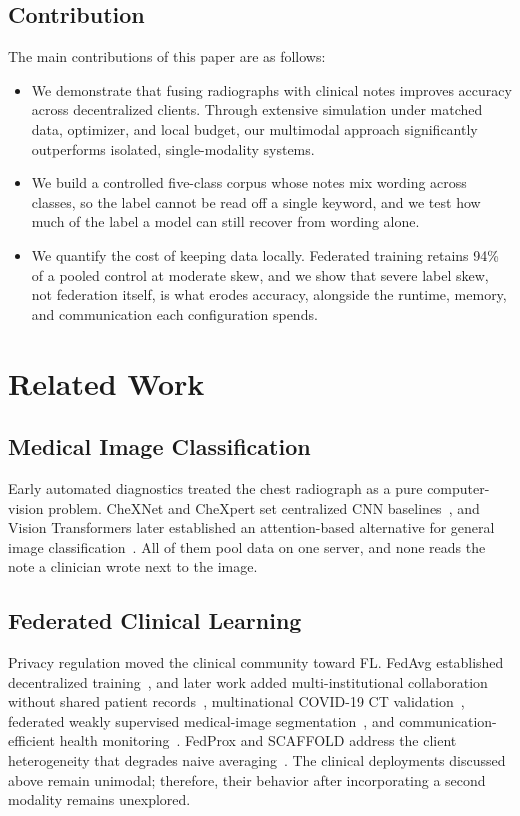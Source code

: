 \documentclass[letterpaper, conference]{IEEEtran}
\begin{document}
\subsection{Contribution}
The main contributions of this paper are as follows:
\begin{itemize}
\item We demonstrate that fusing radiographs with clinical notes improves accuracy across decentralized clients. Through extensive simulation under matched data, optimizer, and local budget, our multimodal approach significantly
outperforms isolated, single-modality systems.
\item We build a controlled five-class corpus whose notes mix wording across classes, so the label cannot be read off a single keyword, and we test how much of the label a model can still recover from wording alone.
\item We quantify the cost of keeping data locally. Federated training retains 94\% of a pooled control at moderate skew, and we show that severe label skew, not federation itself, is what erodes accuracy, alongside the runtime, memory, and communication each configuration spends.
\end{itemize}


\section{Related Work}

\subsection{Medical Image Classification}
Early automated diagnostics treated the chest radiograph as a pure computer-vision
problem. CheXNet and CheXpert set centralized CNN
baselines~\cite{Rajpurkar2017chexnet,Irvin2019}, and Vision Transformers later
established an attention-based alternative for general image
classification~\cite{Dosovitskiy2021}. All of them
pool data on one server, and none reads the note a clinician wrote next to the image.

\subsection{Federated Clinical Learning}
Privacy regulation moved the clinical community toward FL. FedAvg established
decentralized training~\cite{McMahan2017}, and later work added multi-institutional
collaboration without shared patient records~\cite{Sheller2020}, multinational
COVID-19 CT validation~\cite{Dou2021}, federated weakly supervised medical-image
segmentation~\cite{Lin2025fedlppa}, and communication-efficient health
monitoring~\cite{Chu2022globecom}. FedProx and SCAFFOLD address the client heterogeneity
  that degrades naive averaging~\cite{Li2020fedprox,Karimireddy2020,Tian2022globecom}. The clinical
  deployments discussed above remain unimodal; therefore, their behavior after
  incorporating a second modality remains unexplored.
\end{document}
